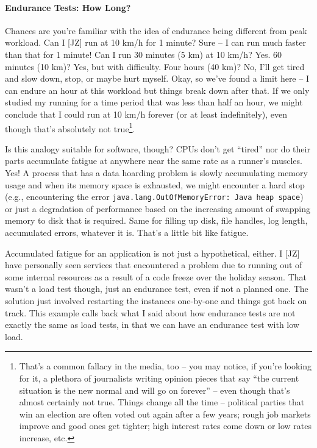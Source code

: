 \paragraph{Endurance Tests: How Long?}
Chances are you're familiar with the idea of endurance being different from peak workload. Can I [JZ] run at 10 km/h for 1 minute? Sure -- I can run much faster than that for 1 minute! Can I run 30 minutes (5 km) at 10 km/h? Yes. 60 minutes (10 km)? Yes, but with difficulty. Four hours (40 km)? No, I'll get tired and slow down, stop, or maybe hurt myself. Okay, so we've found a limit here -- I can endure an hour at this workload but things break down after that. If we only studied my running for a time period that was less than half an hour, we might conclude that I could run at 10 km/h forever (or at least indefinitely), even though that's absolutely not true\footnote{That's a common fallacy in the media, too -- you may notice, if you're looking for it, a plethora of journalists writing opinion pieces that say ``the current situation is the new normal and will go on forever'' -- even though that's almost certainly not true. Things change all the time -- political parties that win an election are often voted out again after a few years; rough job markets improve and good ones get tighter; high interest rates come down or low rates increase, etc.}.

Is this analogy suitable for software, though? CPUs don't get ``tired'' nor do their parts accumulate fatigue at anywhere near the same rate as a runner's muscles. Yes! A process that has a data hoarding problem is slowly accumulating memory usage and when its memory space is exhausted, we might encounter a hard stop (e.g., encountering the error \texttt{java.lang.OutOfMemoryError: Java heap space}) or just a degradation of performance based on the increasing amount of swapping memory to disk that is required. Same for filling up disk, file handles, log length, accumulated errors, whatever it is. That's a little bit like fatigue.

Accumulated fatigue for an application is not just a hypothetical, either. I [JZ] have personally seen services that encountered a problem due to running out of some internal resources as a result of a code freeze over the holiday season. That wasn't a load test though, just an endurance test, even if not a planned one. The solution just involved restarting the instances one-by-one and things got back on track. This example calls back what I said about how endurance tests are not exactly the same as load tests, in that we can have an endurance test with low load. 

